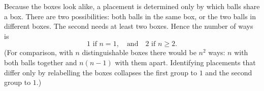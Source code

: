 Because the boxes look alike, a placement is determined only by which balls share a box. There are two possibilities: both balls in the same box, or the two balls in different boxes. The second needs at least two boxes. Hence the number of ways is
\[\boxed{1\text{ if }n=1,\quad\text{and}\quad2\text{ if }n\ge2}.\]
(For comparison, with $n$ distinguishable boxes there would be $n^2$ ways: $n$ with both balls together and $n(n-1)$ with them apart. Identifying placements that differ only by relabelling the boxes collapses the first group to $1$ and the second group to $1$.)
